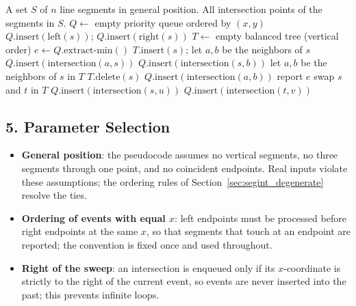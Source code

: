 \begin{algorithm}[htbp]
\caption{Bentley--Ottmann Segment Intersection}
\label{alg:segint_bentley_ottmann}
\begin{algorithmic}[1]
\Require A set $S$ of $n$ line segments in general position.
\Ensure All intersection points of the segments in $S$.
  \State $Q \gets$ empty priority queue ordered by $(x, y)$
    \State $Q.\text{insert}(\text{left}(s))$; $Q.\text{insert}(\text{right}(s))$
  \EndFor
  \State $T \gets$ empty balanced tree (vertical order)
    \State $e \gets Q.\text{extract-min}()$
      \State $T.\text{insert}(s)$; let $a,b$ be the neighbors of $s$
        \State $Q.\text{insert}(\text{intersection}(a,s))$
      \EndIf
        \State $Q.\text{insert}(\text{intersection}(s,b))$
      \EndIf
      \State let $a,b$ be the neighbors of $s$ in $T$
      \State $T.\text{delete}(s)$
        \State $Q.\text{insert}(\text{intersection}(a,b))$
      \EndIf
      \State report $e$
      \State swap $s$ and $t$ in $T$
        \State $Q.\text{insert}(\text{intersection}(s,u))$
      \EndIf
        \State $Q.\text{insert}(\text{intersection}(t,v))$
      \EndIf
    \EndIf
  \EndWhile
\EndFunction
\end{algorithmic}
\end{algorithm}

\subsection{5. Parameter Selection}

\begin{itemize}
\item \textbf{General position}: the pseudocode assumes no vertical
  segments, no three segments through one point, and no coincident
  endpoints. Real inputs violate these assumptions; the ordering rules of
  Section~\ref{sec:segint_degenerate} resolve the ties.
\item \textbf{Ordering of events with equal $x$}: left endpoints must be
  processed before right endpoints at the same $x$, so that segments that
  touch at an endpoint are reported; the convention is fixed once and used
  throughout.
\item \textbf{Right of the sweep}: an intersection is enqueued only if its
  $x$-coordinate is strictly to the right of the current event, so events
  are never inserted into the past; this prevents infinite loops.
\end{itemize}

